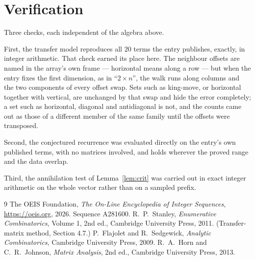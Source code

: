 \documentclass[11pt,a4paper]{article}
\theoremstyle{plain}
\theoremstyle{definition}
\begin{document}
\section{Verification}

Three checks, each independent of the algebra above.

First, the transfer model reproduces all $20$ terms the entry publishes, exactly, in
integer arithmetic. That check earned its place here. The neighbour offsets are named in the
array's own frame --- horizontal means along a row --- but when the entry fixes the first
dimension, as in ``$2\times n$'', the walk runs along columns and the two components of every
offset swap. Sets such as king-move, or horizontal together with vertical, are unchanged by
that swap and hide the error completely; a set such as horizontal, diagonal and antidiagonal
is not, and the counts came out as those of a different member of the same family until the
offsets were transposed.

Second, the conjectured recurrence was evaluated directly on the entry's own published terms,
with no matrices involved, and holds wherever the proved range and the data overlap.

Third, the annihilation test of Lemma~\ref{lem:crit} was carried out in exact integer
arithmetic on the whole vector rather than on a sampled prefix.

\begin{thebibliography}{9}
 The OEIS Foundation, \emph{The On-Line Encyclopedia of Integer
Sequences}, \url{https://oeis.org}, 2026. Sequence A281600.
 R.~P.~Stanley, \emph{Enumerative Combinatorics}, Volume 1, 2nd ed.,
Cambridge University Press, 2011. (Transfer-matrix method, Section 4.7.)
 P.~Flajolet and R.~Sedgewick, \emph{Analytic Combinatorics}, Cambridge
University Press, 2009.
 R.~A.~Horn and C.~R.~Johnson, \emph{Matrix Analysis}, 2nd ed., Cambridge
University Press, 2013.
\end{thebibliography}
\end{document}
